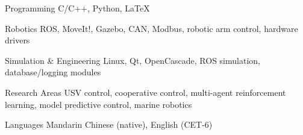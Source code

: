 

\begin{cvskills}

  \cvskill
    {Programming}
    {C/C++, Python, LaTeX}

  \cvskill
    {Robotics}
    {ROS, MoveIt!, Gazebo, CAN, Modbus, robotic arm control, hardware drivers}

  \cvskill
    {Simulation \& Engineering}
    {Linux, Qt, OpenCascade, ROS simulation, database/logging modules}

  \cvskill
    {Research Areas}
    {USV control, cooperative control, multi-agent reinforcement learning, model predictive control, marine robotics}

  \cvskill
    {Languages}
    {Mandarin Chinese (native), English (CET-6)}

\end{cvskills}
